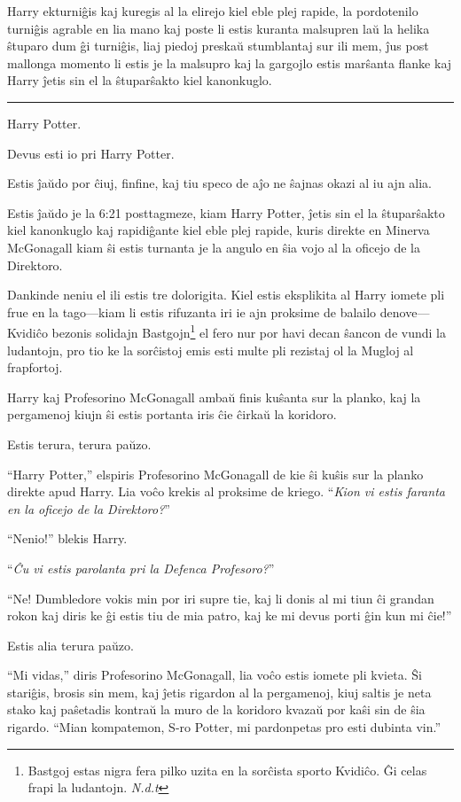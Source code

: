 Harry ekturniĝis kaj kuregis al la elirejo kiel eble plej rapide, la
pordotenilo turniĝis agrable en lia mano kaj poste li estis kuranta
malsupren laŭ la helika ŝtuparo dum ĝi turniĝis, liaj piedoj preskaŭ
stumblantaj sur ili mem, ĵus post mallonga momento li estis je la
malsupro kaj la gargojlo estis marŝanta flanke kaj Harry ĵetis sin el
la ŝtuparŝakto kiel kanonkuglo.

\begin{center}\rule{3in}{0.4pt}\end{center}

Harry Potter.

Devus esti io pri Harry Potter.

Estis ĵaŭdo por ĉiuj, finfine, kaj tiu speco de aĵo ne ŝajnas okazi al
iu ajn alia.

Estis ĵaŭdo je la 6:21 posttagmeze, kiam Harry Potter, ĵetis sin el la
ŝtuparŝakto kiel kanonkuglo kaj rapidiĝante kiel eble plej rapide,
kuris direkte en Minerva McGonagall kiam ŝi estis turnanta je la
angulo en ŝia vojo al la oficejo de la Direktoro.

Dankinde neniu el ili estis tre dolorigita. Kiel estis eksplikita al
Harry iomete pli frue en la tago—kiam li estis rifuzanta iri ie ajn
proksime de balailo denove—Kvidiĉo bezonis solidajn
Bastgojn\footnote{Bastgoj estas nigra fera pilko uzita en la sorĉista
sporto Kvidiĉo. Ĝi celas frapi la ludantojn. \emph{N.d.t}} el fero nur
por havi decan ŝancon de vundi la ludantojn, pro tio ke la sorĉistoj
emis esti multe pli rezistaj ol la Mugloj al frapfortoj.

Harry kaj Profesorino McGonagall ambaŭ finis kuŝanta sur la planko,
kaj la pergamenoj kiujn ŝi estis portanta iris ĉie ĉirkaŭ la koridoro.

Estis terura, terura paŭzo.

``Harry Potter,'' elspiris Profesorino McGonagall de kie ŝi kuŝis sur
la planko direkte apud Harry. Lia voĉo krekis al proksime de
kriego. ``\emph{Kion vi estis faranta en la oficejo de la
Direktoro?}''


``Nenio!'' blekis Harry.

``\emph{Ĉu vi estis parolanta pri la Defenca Profesoro?}''

``Ne! Dumbledore vokis min por iri supre tie, kaj li donis al mi tiun
ĉi grandan rokon kaj diris ke ĝi estis tiu de mia patro, kaj ke mi
devus porti ĝin kun mi ĉie!''

Estis alia terura paŭzo.

``Mi vidas,'' diris Profesorino McGonagall, lia voĉo estis iomete pli
kvieta. Ŝi stariĝis, brosis sin mem, kaj ĵetis rigardon al la
pergamenoj, kiuj saltis je neta stako kaj paŝetadis kontraŭ la muro de
la koridoro kvazaŭ por kaŝi sin de ŝia rigardo. ``Mian kompatemon,
S-ro Potter, mi pardonpetas pro esti dubinta vin.'' 

